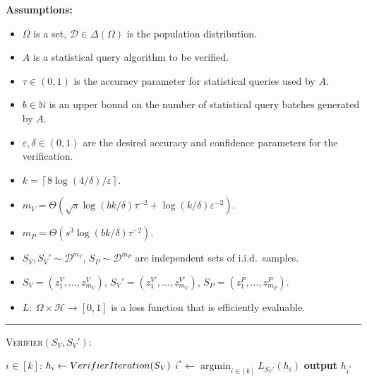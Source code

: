 \documentclass[11pt]{article}
\numberwithin{equation}{section}
\theoremstyle{definition}
\theoremstyle{plain}
\theoremstyle{definition}\newtheorem{notation}[theorem]{Notation}\theoremstyle{plain}\raggedbottom
\newcommand{\roundBrackets}[1]{
	\mathopen{}\left(#1\right)\mathclose{}
}
\newcommand{\ThetaOf}[1]{\Theta\roundBrackets{#1}}
\newcommand{\argmin}{\operatorname{argmin}}
\newcommand{\distribution}[1]{\Delta\roundBrackets{#1}}
\newcommand{\Loss}[2]{\LossNameEmpty_{#1}\roundBrackets{#2}}
\newcommand{\LossNameEmpty}{L}
\newcommand{\bbN}{\mathbb{N}}
\newcommand{\cD}{\mathcal{D}}
\newcommand{\cH}{\mathcal{H}}
\newcommand{\1}{\mathds{1}}
\newcommand{\mP}{m_{\scriptscriptstyle P}}
\newcommand{\mV}{m_{\scriptscriptstyle V}}
\newcommand{\batchUpperBound}{b}
\newcommand{\psUpperBound}{s}
\newcommand{\numIterations}{k}
\newcommand{\numIterationsExpression}{\left\lceil 8\log(4/\delta)/\varepsilon \right\rceil}
\newcommand{\samplepoint}[2]{{z_{#1}^{\scriptscriptstyle{#2}}}}
\newenvironment{ShadedAlgorithmBox}{\begin{tcolorbox}[colback=myLipicsLightGray,colframe=myLipicsLightGray,arc=-1pt]\begin{minipage}{0.975\textwidth}}{\end{minipage}\end{tcolorbox}}
\begin{document}
\begin{protocol}[H]
	\begin{ShadedAlgorithmBox}
		{\bfseries Assumptions:} 
		\begin{itemize}
			\item{
				$\Omega$ is a set, $\cD \in \distribution{\Omega}$ is the population distribution.
			}
			\item{
				$A$ is a statistical query algorithm to be verified.
			}
			\item{
				$\tau \in (0,1)$ is the accuracy parameter for statistical queries used by $A$.
			}
			\item{
				$\batchUpperBound \in \bbN$ is an upper bound on the number of statistical query batches generated by $A$.
			}
			\item{
				$\varepsilon,\delta \in (0,1)$ are the desired accuracy and confidence parameters for the verification.
			}
			\item{
				$\numIterations = \numIterationsExpression$.
			}
			\item{
				$\mV = \ThetaOf{\sqrt{\psUpperBound}\log(\batchUpperBound \numIterations/\delta)\tau^{-2} + \log(\numIterations/\delta)\varepsilon^{-2}}$.
			}
			\item{
				$\mP = \ThetaOf{\psUpperBound^3\log(\batchUpperBound \numIterations/\delta)\tau^{-2}}$.
			}
			\item{
				$S_{V},S_{V}' \sim \cD^{\mV}$, $S_P \sim \cD^{\mP}$ are independent sets of i.i.d.\ samples.
			}
			\item{
				$S_{V} = (\samplepoint{1}{V},\dots,\samplepoint{\mV}{V})$, $S_{V}' = (\samplepoint{1}{V'},\dots,\samplepoint{\mV}{V'})$, $S_P = (\samplepoint{1}{P},\dots,\samplepoint{\mP}{P})$.
			}
			\item{
				$\LossNameEmpty: ~ \Omega \times \cH \rightarrow [0,1]$ is a loss function that is efficiently evaluable.
			}
		\end{itemize}
		
		\noindent\rule{\textwidth}{0.5pt}
		
		\vspace*{0.5em}
		
		\textsc{Verifier}$(S_V, S_V')$:
		\begin{algorithmic}
			\For $i \in [\numIterations]$: 
			\State $h_i \gets \textsc{VerifierIteration}(S_V)$
			\EndFor
			\State $i^* \gets \argmin_{i \in [\numIterations]} \Loss{S_V'}{h_i}$
			\State \textbf{output} $h_{i^*}$
		\end{algorithmic}
		

\end{ShadedAlgorithmBox}
\end{protocol}
\end{document}

